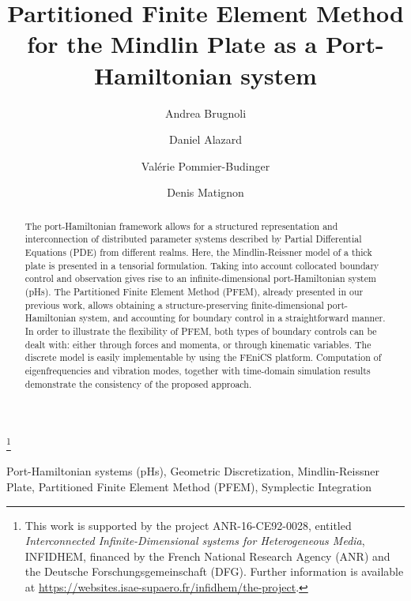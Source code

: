 \documentclass{ifacconf}
\begin{document}
\begin{frontmatter}

\title{Partitioned Finite Element Method for the Mindlin Plate as a Port-Hamiltonian system } 

\thanks[footnoteinfo]{This work is  supported by the project ANR-16-CE92-0028,
	entitled {\em Interconnected Infinite-Dimensional systems for Heterogeneous
		Media}, INFIDHEM, financed by the French National
	Research Agency (ANR) and the Deutsche Forschungsgemeinschaft (DFG). Further information is available at {\url{https://websites.isae-supaero.fr/infidhem/the-project}}.
	}

\author[ISAE]{Andrea Brugnoli}
\author[ISAE]{Daniel Alazard} 
\author[ISAE]{Val\'erie Pommier-Budinger}
\author[ISAE]{Denis Matignon}

\address[ISAE]{ISAE-SUPAERO, Universit\'e de Toulouse, France.\\
	10 Avenue Edouard Belin, BP-54032, 31055 Toulouse Cedex 4. \\
	Andrea.Brugnoli@isae.fr,  Daniel.Alazard@isae.fr, \\
	Valerie.Budinger@isae.fr, Denis.Matignon@isae.fr}

\begin{abstract}
The port-Hamiltonian framework allows for a structured representation and interconnection of distributed parameter systems described by Partial Differential Equations (PDE) from different realms. Here, the Mindlin-Reissner model of a thick plate is presented in a tensorial formulation. Taking into account collocated boundary control and observation gives rise to an infinite-dimensional port-Hamiltonian system (pHs). The Partitioned Finite Element Method (PFEM), already presented in our previous work, allows obtaining a structure-preserving finite-dimensional port-Hamiltonian system, and accounting for boundary control in a straightforward manner. In order to illustrate the flexibility of PFEM, both types of boundary controls can be dealt with: either through forces and momenta, or through kinematic variables. The discrete model is easily implementable by using the FEniCS platform. Computation of eigenfrequencies and vibration modes, together with time-domain simulation results demonstrate the consistency of the proposed approach.
\end{abstract}

\begin{keyword}
Port-Hamiltonian systems (pHs), Geometric Discretization, Mindlin-Reissner Plate, Partitioned Finite Element Method (PFEM), Symplectic Integration
\end{keyword}

\end{frontmatter}
\end{document}
